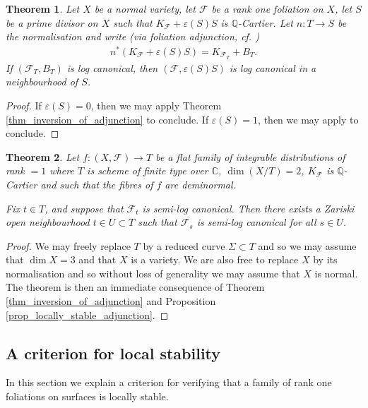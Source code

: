 \documentclass[12pt, a4paper]{amsart}
\newcounter{Theorem}
\newtheorem{theorem}{Theorem}[section]
\theoremstyle{definition}
\theoremstyle{named}
\begin{document}
\begin{theorem}
\label{thm_inversion_of_adjunction_full}
Let $X$ be a normal variety, let $\mathcal F$ be a rank one foliation on $X$, let $S$ be a prime divisor on $X$ such that $K_{\mathcal F}+\varepsilon(S)S$ is $\mathbb Q$-Cartier.
Let $n\colon T \rightarrow S$ be the normalisation and write (via foliation adjunction, cf. \cite[Proposition-Definition 3.7]{CS23b}) \begin{align*}n^*(K_{\mathcal F}+\varepsilon(S)S) = K_{\mathcal F_T}+B_T.\end{align*} 
If $(\mathcal F_T, B_T)$ is log canonical, then 
$(\mathcal F, \varepsilon(S)S)$ is log canonical in a neighbourhood of $S$.
\end{theorem}
\begin{proof}
    If $\varepsilon(S) = 0$, then we may apply Theorem \ref{thm_inversion_of_adjunction} to conclude.
    If $\varepsilon(S) = 1$, then we may apply \cite[Theorem 3.16]{CS23b} to conclude.
\end{proof}




 \begin{theorem}
 \label{thm_lc_deform}
     Let $f\colon (X, \mathcal F) \rightarrow T$
     be a flat family of integrable distributions of rank $=1$ where $T$ is scheme of finite type over $\mathbb C$, $\dim (X/T) = 2$, $K_{\mathcal F}$ is $\mathbb Q$-Cartier and such that the fibres of $f$ are deminormal.

Fix $t \in T$, and suppose that $\mathcal F_t$ is semi-log canonical.  Then there exists a Zariski open neighbourhood $t \in U \subset T$ such that 
$\mathcal F_s$ is semi-log canonical for all $s \in U$.
 \end{theorem}
\begin{proof}
We may freely replace $T$ by a reduced curve $\Sigma \subset T$ and so we may assume that $\dim X = 3$
and that $X$ is a variety.
We are also free to replace $X$ by its normalisation and so without loss of generality we may assume that $X$ is normal.  The theorem is then an immediate consequence of Theorem \ref{thm_inversion_of_adjunction} and Proposition \ref{prop_locally_stable_adjunction}.
\end{proof}






\subsection{A criterion for local stability}
In this section we explain a criterion for verifying that 
a family of rank one foliations on surfaces is locally stable.
\end{document}
